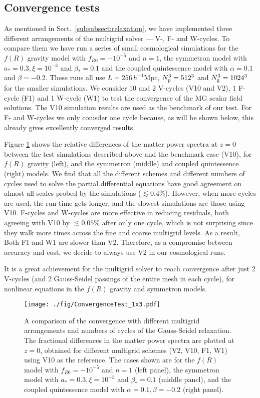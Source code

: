 \subsection{Convergence tests}
\label{subsect:convergence_tests}

As mentioned in Sect.~\ref{subsubsect:relaxation}, we have implemented three different arrangements of the multigrid solver --- V-, F- and W-cycles. To compare them we have run a series of small cosmological simulations for the $f(R)$ gravity model with $f_{R0} = -10^{-5}$ and $n=1$, the symmetron model with $a_\ast = 0.3, \xi = 10^{-3}$ and $\beta_\ast = 0.1$ and the coupled quintessence model with $\alpha = 0.1$ and $\beta = -0.2$. These runs all use $L = 256 \, h^{-1}\mathrm{Mpc}$, $N_{\rm p}^3 = 512^3$ and $N_{\rm g}^3 = 1024^3$ for the smaller simulations. We consider $10$ and $2$ V-cycles (V10 and V2), $1$ F-cycle (F1) and 1 W-cycle (W1) to test the convergence of the \ac{MG} scalar field solutions. The V10 simulation results are used as the benchmark of our test. 
For F- and W-cycles we only conisder one cycle because, as will be shown below, this already gives excellently converged results.

Figure \ref{fig:ConvergenceTest} shows the relative differences
of the matter power spectra at $z=0$ between the test simulations described above and the benchmark case (V10), for $f(R)$ gravity (left), and the symmetron (middle) and coupled quintessence (right) models. We find that all the different schemes and different numbers of cycles used to solve the partial differential equations have good agreement on almost all scales probed by the simulations ($\lesssim0.4\%$). However, when more cycles are used, the run time gets longer, and the slowest simulations are those using V10. 
F-cycles and W-cycles are more effective in reducing residuals, both agreeing with V10 by $\lesssim0.05\%$ after only one cycle, which is not surprising since they walk more times across the fine and coarse multigrid levels. As a result, Both F1 and W1 are slower than V2. Therefore, as a compromise between accuracy and cost, we decide to always use V2 in our cosmological runs. 

It is a great achievement for the multigrid solver to reach convergence after just 2 V-cycles (and 2 Gauss-Seidel passings of the entire mesh in each cycle), for nonlinear equations in
the $f(R)$ gravity and symmetron models.

\begin{figure}
    \centering 
    \texttt{[image: ./fig/ConvergenceTest\_1x3.pdf]}
    \caption{A comparison of the convergence with different multigrid arrangements and numbers of cycles of the Gauss-Seidel relaxation. The fractional differences in the matter power spectra are plotted at $z=0$, obtained for different multigrid schemes (V2, V10, F1, W1) using V10 as the reference. 
    The cases shown are for the $f(R)$ model with $f_{R0} = -10^{-5}$ and $n=1$ (left panel), the symmetron model with $a_* = 0.3, \xi=10^{-3}$ and $\beta_* = 0.1$ (middle panel), and the coupled quintessence model with $\alpha = 0.1, \beta = -0.2$ (right panel).}
    \label{fig:ConvergenceTest}
\end{figure}

